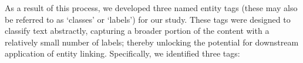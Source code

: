\documentclass[11pt]{article}
\begin{document}




As a result of this process, we developed three named entity tags (these may also be referred to as `classes' or `labels') for our study. These tags were designed to classify text abstractly, capturing a broader portion of the content with a relatively small number of labels; thereby unlocking the potential for downstream application of entity linking. Specifically, we identified three tags:


\end{document}

